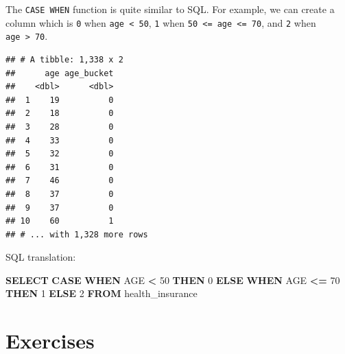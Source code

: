 \documentclass[openany]{book}
\newenvironment{Shaded}{\begin{snugshade}}{\end{snugshade}}
\newcommand{\ControlFlowTok}[1]{\textcolor[rgb]{0.13,0.29,0.53}{\textbf{#1}}}
\newcommand{\DataTypeTok}[1]{\textcolor[rgb]{0.13,0.29,0.53}{#1}}
\newcommand{\DecValTok}[1]{\textcolor[rgb]{0.00,0.00,0.81}{#1}}
\newcommand{\KeywordTok}[1]{\textcolor[rgb]{0.13,0.29,0.53}{\textbf{#1}}}
\newcommand{\NormalTok}[1]{#1}
\newcommand{\OperatorTok}[1]{\textcolor[rgb]{0.81,0.36,0.00}{\textbf{#1}}}
\newcommand{\StringTok}[1]{\textcolor[rgb]{0.31,0.60,0.02}{#1}}
\begin{document}
The \texttt{CASE\ WHEN} function is quite similar to SQL. For example, we can create a column which is \texttt{0} when \texttt{age\ \textless{}\ 50}, \texttt{1} when \texttt{50\ \textless{}=\ age\ \textless{}=\ 70}, and \texttt{2} when \texttt{age\ \textgreater{}\ 70}.

\begin{Shaded}
\end{Shaded}

\begin{verbatim}
## # A tibble: 1,338 x 2
##      age age_bucket
##    <dbl>      <dbl>
##  1    19          0
##  2    18          0
##  3    28          0
##  4    33          0
##  5    32          0
##  6    31          0
##  7    46          0
##  8    37          0
##  9    37          0
## 10    60          1
## # ... with 1,328 more rows
\end{verbatim}

SQL translation:

\begin{Shaded}
\begin{Highlighting}[]
\KeywordTok{SELECT} \ControlFlowTok{CASE} \ControlFlowTok{WHEN}\NormalTok{ AGE }\OperatorTok{<} \DecValTok{50} \ControlFlowTok{THEN} \DecValTok{0}
       \ControlFlowTok{ELSE} \ControlFlowTok{WHEN}\NormalTok{ AGE }\OperatorTok{<=} \DecValTok{70} \ControlFlowTok{THEN} \DecValTok{1}
       \ControlFlowTok{ELSE} \DecValTok{2}
\KeywordTok{FROM}\NormalTok{ health_insurance}
\end{Highlighting}
\end{Shaded}

\hypertarget{exercises}{%
\section{Exercises}\label{exercises}}
\end{document}
